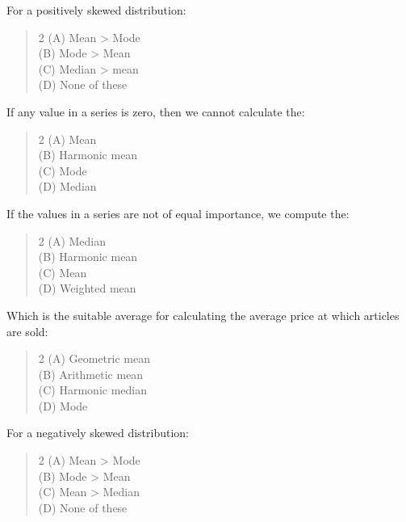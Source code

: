 \documentclass[11pt,a4paper]{article}
\begin{document}
\begin{mcqlist}
\item For a positively skewed distribution:
\begin{quote}\begin{multicols}{2}
\noindent (A) Mean > Mode \\
(B) Mode > Mean \\
(C) Median > mean \\
(D) None of these
\end{multicols}\end{quote}

\item If any value in a series is zero, then we cannot calculate the:
\begin{quote}\begin{multicols}{2}
\noindent (A) Mean \\
(B) Harmonic mean \\
(C) Mode \\
(D) Median
\end{multicols}\end{quote}

\item If the values in a series are not of equal importance, we compute the:
\begin{quote}\begin{multicols}{2}
\noindent (A) Median \\
(B) Harmonic mean \\
(C) Mean \\
(D) Weighted mean
\end{multicols}\end{quote}

\item Which is the suitable average for calculating the average price at which articles are sold:
\begin{quote}\begin{multicols}{2}
\noindent (A) Geometric mean \\
(B) Arithmetic mean \\
(C) Harmonic median \\
(D) Mode
\end{multicols}\end{quote}

\item For a negatively skewed distribution:
\begin{quote}\begin{multicols}{2}
\noindent (A) Mean > Mode \\
(B) Mode > Mean \\
(C) Mean > Median \\
(D) None of these
\end{multicols}\end{quote}


\end{mcqlist}
\end{document}
